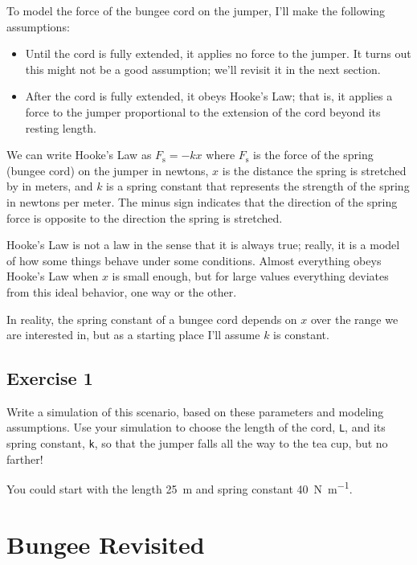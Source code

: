 To model the force of the bungee cord on the jumper, I'll make the following assumptions:

\begin{itemize}

\item Until the cord is fully extended, it applies no force to the jumper.  It turns out this might not be a good assumption; we'll revisit it in the next section.

\item After the cord is fully extended, it obeys Hooke's Law; that is, it applies a force to the jumper proportional to the extension of the cord beyond its resting length.

\end{itemize}

We can write Hooke's Law as
%
$F_\mathrm{s} = -k x$
%
where $F_\mathrm{s}$ is the force of the spring (bungee cord) on the jumper in newtons, $x$ is the distance the spring is stretched by in meters, and $k$ is a spring constant that represents the strength of the spring in newtons per meter.
The minus sign indicates that the direction of the spring force is opposite to the direction the spring is stretched.


Hooke's Law is not a law in the sense that it is always true; really, it is a model of how some things behave under some conditions.
Almost everything obeys Hooke's Law when $x$ is small enough, but for large values everything deviates from this ideal behavior, one way or the other.

In reality, the spring constant of a bungee cord depends on $x$ over the range we are interested in, but as a starting place I'll assume $k$ is constant.


\subsection{Exercise 1}

Write a simulation of this scenario, based on these parameters and modeling assumptions.
Use your simulation to choose the length of the cord, \lstinline{L}, and its spring constant, \lstinline{k}, so that the jumper falls all the way to the tea cup, but no farther!

You could start with the length \SI{25}{\meter} and spring constant \SI{40}{\newton \per \meter}.


\section{Bungee Revisited}

